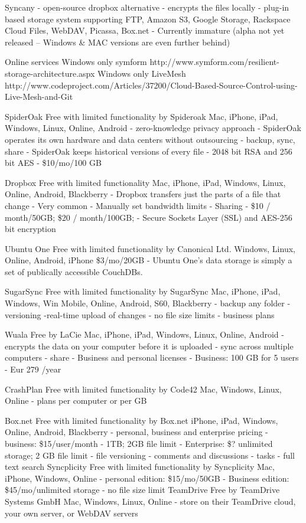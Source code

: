 			Syncany
				- open-source dropbox alternative
				- encrypts the files locally
				- plug-in based storage system supporting FTP, Amazon S3, Google Storage, Rackspace Cloud Files, WebDAV, Picassa, Box.net
				- Currently immature (alpha not yet released -- Windows & MAC versions are even further behind)
		
		
		Online services
			Windows only
				symform
				http://www.symform.com/resilient-storage-architecture.aspx
					Windows only
				LiveMesh 
					http://www.codeproject.com/Articles/37200/Cloud-Based-Source-Control-using-Live-Mesh-and-Git
			
			SpiderOak
				Free with limited functionality by Spideroak
				Mac, iPhone, iPad, Windows, Linux, Online, Android
				- zero-knowledge privacy approach 
				- SpiderOak operates its own hardware and data centers without outsourcing
				- backup, sync, share
				- SpiderOak keeps historical versions of every file
				- 2048 bit RSA and 256 bit AES
				- \$10/mo/100 GB
				
			Dropbox
				Free with limited functionality 
				Mac, iPhone, iPad, Windows, Linux, Online, Android, Blackberry
				- Dropbox transfers just the parts of a file that change
				- Very common
				- Manually set bandwidth limits
				- Sharing
				- \$10 / month/50GB; \$20 / month/100GB; 
				- Secure Sockets Layer (SSL) and AES-256 bit encryption
				
			Ubuntu One
				Free with limited functionality by Canonical Ltd. 
				Windows, Linux, Online, Android, iPhone
				\$3/mo/20GB
				- Ubuntu One's data storage is simply a set of publically accessible CouchDBs.
				
			SugarSync
				Free with limited functionality by SugarSync 
				Mac, iPhone, iPad, Windows, Win Mobile, Online, Android, S60, Blackberry
				- backup any folder
				- versioning
				-real-time upload of changes
				- no file size limits
				- business plans
				
			Wuala
				Free by LaCie 
				Mac, iPhone, iPad, Windows, Linux, Online, Android
				- encrypts the data on your computer before it is uploaded
				- sync across multiple computers
				- share
				- Business and personal licenses
					- Business: 100 GB for 5 users - Eur 279 /year
					
			CrashPlan
				Free with limited functionality by Code42 
				Mac, Windows, Linux, Online
				- plans per computer or per GB
				
			Box.net
				Free with limited functionality by Box.net
				iPhone, iPad, Windows, Online, Android, Blackberry
				- personal, business and enterprise pricing
					- business: \$15/user/month - 1TB; 2GB file limit
					- Enterprise: \$? unlimited storage; 2 GB file limit
				- file versioning
				- comments and discussions
				- tasks
				- full text search
			Syncplicity
				Free with limited functionality by Syncplicity
				Mac, iPhone, Windows, Online
				- personal edition: \$15/mo/50GB
				- Business edition: \$45/mo/unlimited storage
				- no file size limit
			TeamDrive
				Free by TeamDrive Systems GmbH 
				Mac, Windows, Linux, Online
				- store on their TeamDrive cloud, your own server, or WebDAV servers
				
